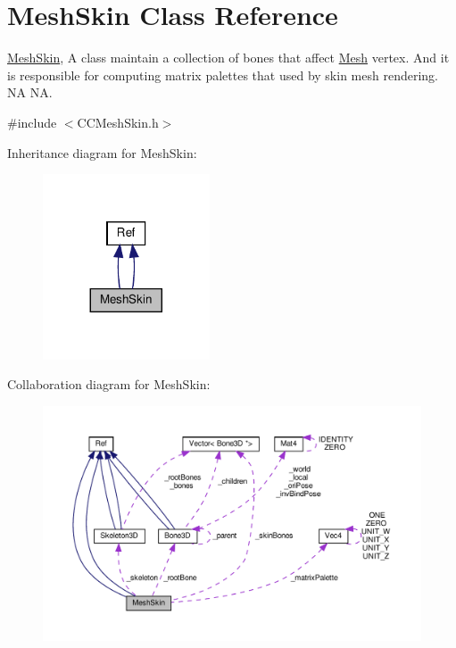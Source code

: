 \hypertarget{classMeshSkin}{}\section{Mesh\+Skin Class Reference}
\label{classMeshSkin}


\hyperlink{classMeshSkin}{Mesh\+Skin}, A class maintain a collection of bones that affect \hyperlink{classMesh}{Mesh} vertex. And it is responsible for computing matrix palettes that used by skin mesh rendering.  NA  NA.  




{\ttfamily \#include $<$C\+C\+Mesh\+Skin.\+h$>$}



Inheritance diagram for Mesh\+Skin\+:
\nopagebreak
\begin{figure}[H]
\begin{center}
\leavevmode
\includegraphics[width=140pt]{classMeshSkin__inherit__graph}
\end{center}
\end{figure}


Collaboration diagram for Mesh\+Skin\+:
\nopagebreak
\begin{figure}[H]
\begin{center}
\leavevmode
\includegraphics[width=350pt]{classMeshSkin__coll__graph}
\end{center}
\end{figure}
